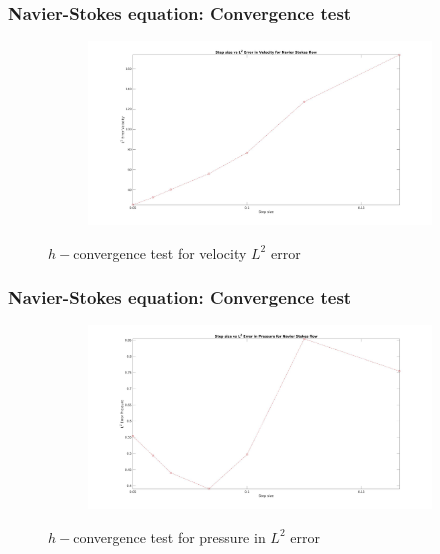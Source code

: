 \documentclass{beamer}
\begin{document}
\begin{frame}
\frametitle{Navier-Stokes equation: Convergence test}
\begin{figure}
\begin{subfigure}{\textwidth}	
    \includegraphics[width=\linewidth]{L2_convergence_velocity_n_s.jpg}
    \label{fig:vel_navier_stoke_conv}
\end{subfigure}
\caption{$h-$convergence test for velocity $L^2$ error}
\label{navier_stoke_conv_l2}
\end{figure}
\end{frame}
\begin{frame}
\frametitle{Navier-Stokes equation: Convergence test}
\begin{figure}
\begin{subfigure}{\textwidth}	
    \includegraphics[width=\linewidth]{L2_convergence_pressure_n_s.jpg}
  \label{fig:pre_navier_stoke_conv}
\end{subfigure}
\caption{$h-$convergence test for pressure in $L^2$ error}
\label{navier_stoke_conv_l2}
\end{figure}
\end{frame}
\end{document}
